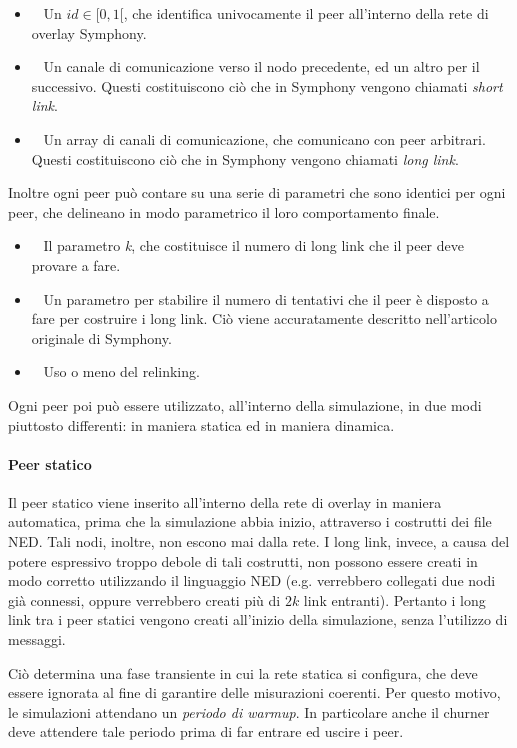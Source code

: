 \documentclass[prodmode,acmtap]{acmlarge}
\begin{document}
\begin{itemize}
	\item ~ Un $id \in [0,1[$, che identifica univocamente il peer all'interno della rete di overlay Symphony. 
	\item ~ Un canale di comunicazione verso il nodo precedente, ed un altro per il successivo. Questi costituiscono ciò che in Symphony vengono chiamati \textit{short link}.
	\item ~ Un array di canali di comunicazione, che comunicano con peer arbitrari. Questi costituiscono ciò che in Symphony vengono chiamati \textit{long link}.
\end{itemize}

Inoltre ogni peer può contare su una serie di parametri che sono identici per ogni peer, che delineano in modo parametrico il loro comportamento finale.

\begin{itemize}
	\item ~ Il parametro \textit{k}, che costituisce il numero di long link che il peer deve provare a fare.
	\item ~ Un parametro per stabilire il numero di tentativi che il peer è disposto a fare per costruire i long link. Ciò viene accuratamente descritto nell'articolo originale di Symphony.
	\item ~ Uso o meno del relinking.
\end{itemize}

Ogni peer poi può essere utilizzato, all'interno della simulazione, in due modi piuttosto differenti: in maniera statica ed in maniera dinamica. 

\paragraph{Peer statico}
Il peer statico viene inserito all'interno della rete di overlay in maniera automatica, prima che la simulazione abbia inizio, attraverso i costrutti dei file NED. Tali nodi, inoltre, non escono mai dalla rete. I long link, invece, a causa del potere espressivo troppo debole di tali costrutti, non possono essere creati in modo corretto utilizzando il linguaggio NED (e.g. verrebbero collegati due nodi già connessi, oppure verrebbero creati più di $2k$ link entranti). Pertanto i long link tra i peer statici vengono creati all'inizio della simulazione, senza l'utilizzo di messaggi.

Ciò determina una fase transiente in cui la rete statica si configura, che deve essere ignorata al fine di garantire delle misurazioni coerenti. Per questo motivo, le simulazioni attendano un \textit{periodo di warmup}. In particolare anche il churner deve attendere tale periodo prima di far entrare ed uscire i peer.
\end{document}
